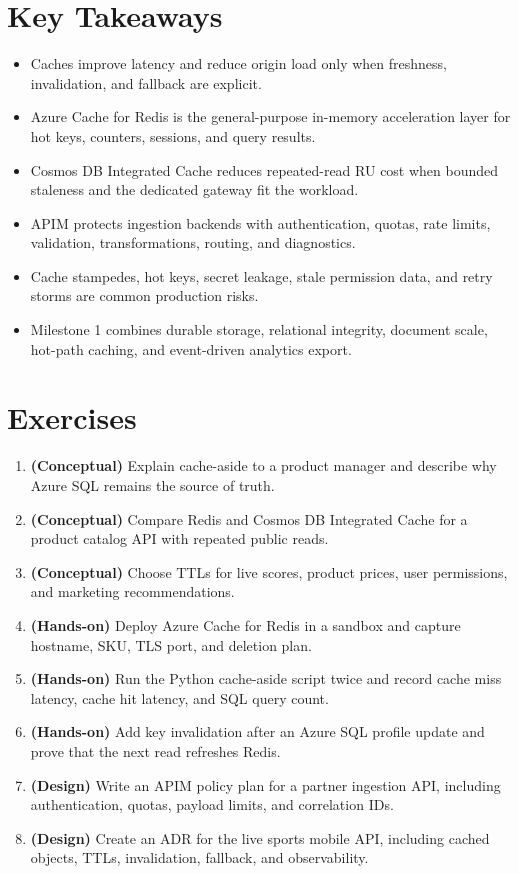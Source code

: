 \section*{Key Takeaways}
\begin{itemize}
    \item Caches improve latency and reduce origin load only when freshness, invalidation, and fallback are explicit.
    \item Azure Cache for Redis is the general-purpose in-memory acceleration layer for hot keys, counters, sessions, and query results.
    \item Cosmos DB Integrated Cache reduces repeated-read RU cost when bounded staleness and the dedicated gateway fit the workload.
    \item APIM protects ingestion backends with authentication, quotas, rate limits, validation, transformations, routing, and diagnostics.
    \item Cache stampedes, hot keys, secret leakage, stale permission data, and retry storms are common production risks.
    \item Milestone 1 combines durable storage, relational integrity, document scale, hot-path caching, and event-driven analytics export.
\end{itemize}

\section{Exercises}
\begin{enumerate}
    \item \textbf{(Conceptual)} Explain cache-aside to a product manager and describe why Azure SQL remains the source of truth.
    \item \textbf{(Conceptual)} Compare Redis and Cosmos DB Integrated Cache for a product catalog API with repeated public reads.
    \item \textbf{(Conceptual)} Choose TTLs for live scores, product prices, user permissions, and marketing recommendations.
    \item \textbf{(Hands-on)} Deploy Azure Cache for Redis in a sandbox and capture hostname, SKU, TLS port, and deletion plan.
    \item \textbf{(Hands-on)} Run the Python cache-aside script twice and record cache miss latency, cache hit latency, and SQL query count.
    \item \textbf{(Hands-on)} Add key invalidation after an Azure SQL profile update and prove that the next read refreshes Redis.
    \item \textbf{(Design)} Write an APIM policy plan for a partner ingestion API, including authentication, quotas, payload limits, and correlation IDs.
    \item \textbf{(Design)} Create an ADR for the live sports mobile API, including cached objects, TTLs, invalidation, fallback, and observability.
\end{enumerate}

